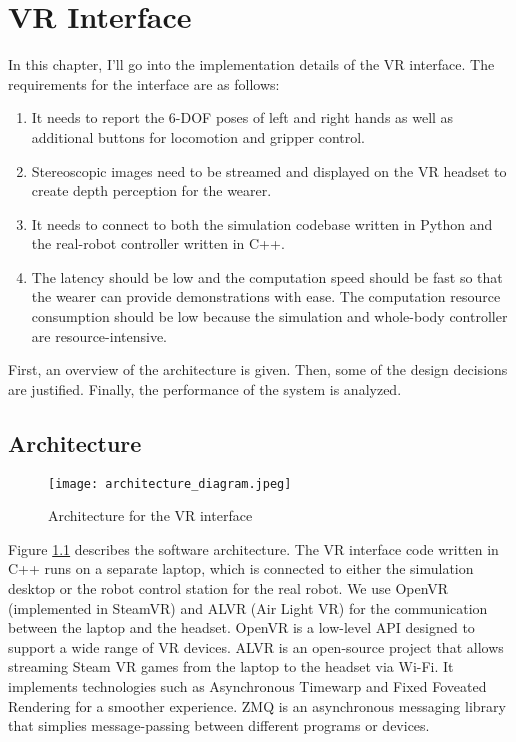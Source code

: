\chapter{VR Interface}

In this chapter, I'll go into the implementation details of the VR interface. 
The requirements for the interface are as follows:
\begin{enumerate}
    \item It needs to report the 6-DOF poses of left and right hands as well as additional buttons for locomotion and gripper control. 
    \item Stereoscopic images need to be streamed and displayed on the VR headset to create depth perception for the wearer. 
    \item It needs to connect to both the simulation codebase written in Python and the real-robot controller written in C++. 
    \item The latency should be low and the computation speed should be fast so that the wearer can provide demonstrations with ease. The computation resource consumption should be low because the simulation and whole-body controller are resource-intensive.
\end{enumerate}

First, an overview of the architecture is given. Then, some of the design decisions are justified. Finally, the performance of the system is analyzed.

\section{Architecture}

\begin{figure}
	\centering
	\texttt{[image: architecture\_diagram.jpeg]}
	\caption{Architecture for the VR interface}
    \label{fig:vr-interface}
\end{figure}

Figure \ref{fig:vr-interface} describes the software architecture. The VR interface code written in C++ runs on a separate laptop, which is connected to either the simulation desktop or the robot control station for the real robot. We use OpenVR (implemented in SteamVR) and ALVR (Air Light VR) for the communication between the laptop and the headset. OpenVR is a low-level API designed to support a wide range of VR devices. ALVR is an open-source project that allows streaming Steam VR games from the laptop to the headset via Wi-Fi. It implements technologies such as Asynchronous Timewarp and Fixed Foveated Rendering for a smoother experience. ZMQ is an asynchronous messaging library that simplies message-passing between different programs or devices. 

